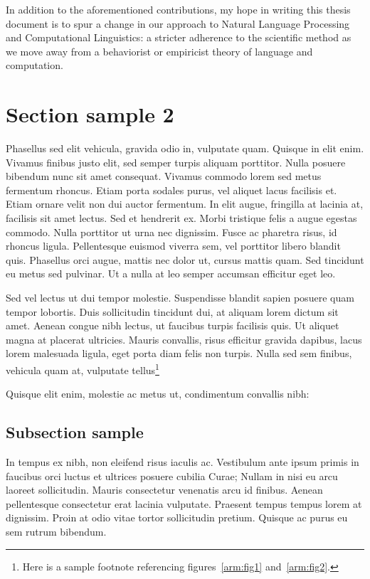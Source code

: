 In addition to the aforementioned contributions, my hope in writing this thesis document is to spur a change in our approach to Natural Language Processing and Computational Linguistics: a stricter adherence to the scientific method as we move away from a behaviorist or empiricist theory of language and computation.

\section{Section sample 2}\label{ch1:sec}

Phasellus sed elit vehicula, gravida odio in, vulputate quam. Quisque in elit enim. Vivamus finibus justo elit, sed semper turpis aliquam porttitor. Nulla posuere bibendum nunc sit amet consequat. Vivamus commodo lorem sed metus fermentum rhoncus. Etiam porta sodales purus, vel aliquet lacus facilisis et. Etiam ornare velit non dui auctor fermentum. In elit augue, fringilla at lacinia at, facilisis sit amet lectus. Sed et hendrerit ex. Morbi tristique felis a augue egestas commodo. Nulla porttitor ut urna nec dignissim. Fusce ac pharetra risus, id rhoncus ligula. Pellentesque euismod viverra sem, vel porttitor libero blandit quis. Phasellus orci augue, mattis nec dolor ut, cursus mattis quam. Sed tincidunt eu metus sed pulvinar. Ut a nulla at leo semper accumsan efficitur eget leo.

Sed vel lectus ut dui tempor molestie. Suspendisse blandit sapien posuere quam tempor lobortis. Duis sollicitudin tincidunt dui, at aliquam lorem dictum sit amet. Aenean congue nibh lectus, ut faucibus turpis facilisis quis. Ut aliquet magna at placerat ultricies. Mauris convallis, risus efficitur gravida dapibus, lacus lorem malesuada ligula, eget porta diam felis non turpis. Nulla sed sem finibus, vehicula quam at, vulputate tellus\footnote{Here is a sample footnote referencing figures~\ref{arm:fig1}
and~\ref{arm:fig2}.}  

Quisque elit enim, molestie ac metus ut, condimentum convallis nibh:

\subsection{Subsection sample}

In tempus ex nibh, non eleifend risus iaculis ac. Vestibulum ante ipsum primis in faucibus orci luctus et ultrices posuere cubilia Curae; Nullam in nisi eu arcu laoreet sollicitudin. Mauris consectetur venenatis arcu id finibus. Aenean pellentesque consectetur erat lacinia vulputate. Praesent tempus tempus lorem at dignissim. Proin at odio vitae tortor sollicitudin pretium. Quisque ac purus eu sem rutrum bibendum.


